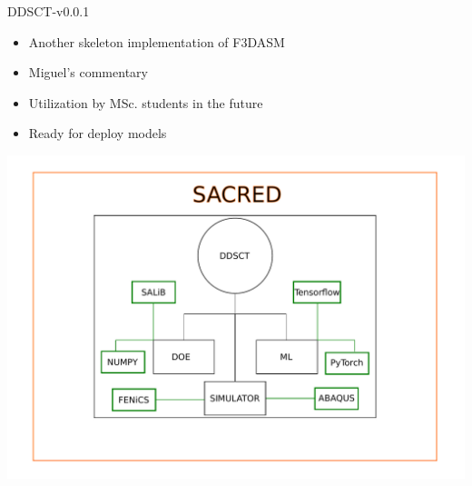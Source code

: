 \documentclass[aspectratio=169]{beamer}
\begin{document}
\begin{frame}{DDSCT-v0.0.1}
  \begin{minipage}{0.5\textwidth}
  \begin{itemize}
    \item Another skeleton implementation of F3DASM
    \item Miguel's commentary
    \item Utilization by MSc. students in the future
    \item Ready for deploy models
  \end{itemize}
  \end{minipage}%
  \begin{minipage}{0.5\textwidth}
    \includegraphics[width=\textwidth]{Figures/DDSCT.pdf}
  \end{minipage}
\end{frame}
\end{document}
